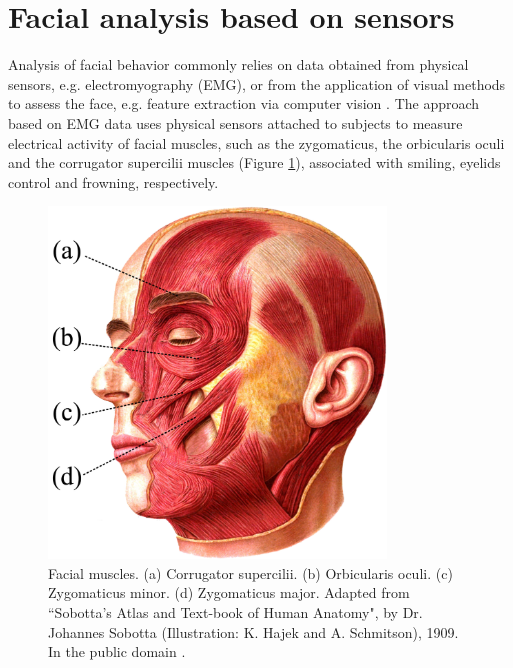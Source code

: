 \section{Facial analysis based on sensors}

Analysis of facial behavior commonly relies on data obtained from physical sensors, e.g. electromyography (EMG), or from the application of visual methods to assess the face, e.g. feature extraction via computer vision \parencite{schrader2017rising}. The approach based on EMG data uses physical sensors attached to subjects to measure electrical activity of facial muscles, such as the zygomaticus, the orbicularis oculi and the corrugator supercilii muscles (Figure \ref{fig:face-muscles}), associated with smiling, eyelids control and frowning, respectively.

\begin{figure}[h!]
\centering
\includegraphics[width=0.8\textwidth]{Content/figures/face-muscles.jpg}
\caption{Facial muscles. (a) Corrugator supercilii. (b) Orbicularis oculi. (c) Zygomaticus minor. (d) Zygomaticus major. Adapted from ``Sobotta's Atlas and Text-book of Human Anatomy", by Dr. Johannes Sobotta (Illustration: K. Hajek and A. Schmitson), 1909. In the public domain \parencite{sobotta1909wikimedia}.}
\label{fig:face-muscles}
\end{figure}

